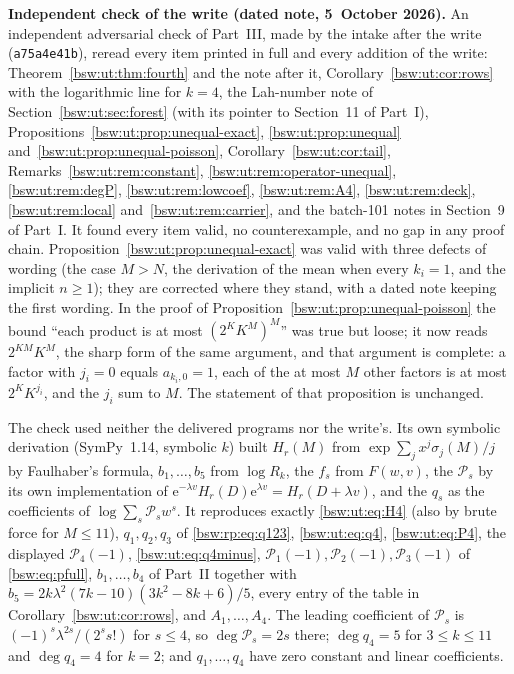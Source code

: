 \documentclass[11pt,letterpaper]{article}
\theoremstyle{definition}
\theoremstyle{remark}
\newcommand{\ee}{\mathrm e}
\begin{document}
\textbf{Independent check of the write (dated note, 5~October 2026).}
An independent adversarial check of Part~III, made by the intake after the
write (\texttt{a75a4e41b}), reread every item printed in full and every
addition of the write: Theorem~\ref{bsw:ut:thm:fourth} and the note after
it, Corollary~\ref{bsw:ut:cor:rows} with the logarithmic line for $k=4$,
the Lah-number note of Section~\ref{bsw:ut:sec:forest} (with its pointer to
Section~11 of Part~I), Propositions~\ref{bsw:ut:prop:unequal-exact},
\ref{bsw:ut:prop:unequal} and~\ref{bsw:ut:prop:unequal-poisson},
Corollary~\ref{bsw:ut:cor:tail}, Remarks~\ref{bsw:ut:rem:constant},
\ref{bsw:ut:rem:operator-unequal}, \ref{bsw:ut:rem:degP},
\ref{bsw:ut:rem:lowcoef}, \ref{bsw:ut:rem:A4}, \ref{bsw:ut:rem:deck},
\ref{bsw:ut:rem:local} and~\ref{bsw:ut:rem:carrier}, and the batch-101
notes in Section~9 of Part~I.  It found every item valid, no
counterexample, and no gap in any proof chain.
Proposition~\ref{bsw:ut:prop:unequal-exact} was valid with three defects
of wording (the case $M>N$, the derivation of the mean when every
$k_i=1$, and the implicit $n\ge1$); they are corrected where they stand,
with a dated note keeping the first wording.  In the proof of
Proposition~\ref{bsw:ut:prop:unequal-poisson} the bound ``each product is
at most $(2^KK^M)^M$'' was true but loose; it now reads $2^{KM}K^M$, the
sharp form of the same argument, and that argument is complete: a factor
with $j_i=0$ equals $a_{k_i,0}=1$, each of the at most $M$ other factors is
at most $2^KK^{j_i}$, and the $j_i$ sum to $M$.  The statement of that
proposition is unchanged.

The check used neither the delivered programs nor the write's.  Its own
symbolic derivation (SymPy~1.14, symbolic $k$) built $H_r(M)$ from
$\exp\sum_jx^j\sigma_j(M)/j$ by Faulhaber's formula, $b_1,\ldots,b_5$ from
$\log R_k$, the $f_s$ from $F(w,v)$, the $\mathcal P_s$ by its own
implementation of $\ee^{-\lambda v}H_r(D)\ee^{\lambda v}=H_r(D+\lambda v)$,
and the $q_s$ as the coefficients of $\log\sum_s\mathcal P_sw^s$.  It
reproduces exactly \eqref{bsw:ut:eq:H4} (also by brute force for
$M\le11$), $q_1,q_2,q_3$ of \eqref{bsw:rp:eq:q123},
\eqref{bsw:ut:eq:q4}, \eqref{bsw:ut:eq:P4}, the displayed
$\mathcal P_4(-1)$, \eqref{bsw:ut:eq:q4minus},
$\mathcal P_1(-1),\mathcal P_2(-1),\mathcal P_3(-1)$ of
\eqref{bsw:eq:pfull}, $b_1,\ldots,b_4$ of Part~II together with
$b_5=2k\lambda^2(7k-10)(3k^2-8k+6)/5$, every entry of the table in Corollary~\ref{bsw:ut:cor:rows}, and
$A_1,\ldots,A_4$.  The leading coefficient of $\mathcal P_s$ is
$(-1)^s\lambda^{2s}/(2^ss!)$ for $s\le4$, so $\deg\mathcal P_s=2s$ there;
$\deg q_4=5$ for $3\le k\le11$ and $\deg q_4=4$ for $k=2$; and
$q_1,\ldots,q_4$ have zero constant and linear coefficients.
\end{document}
